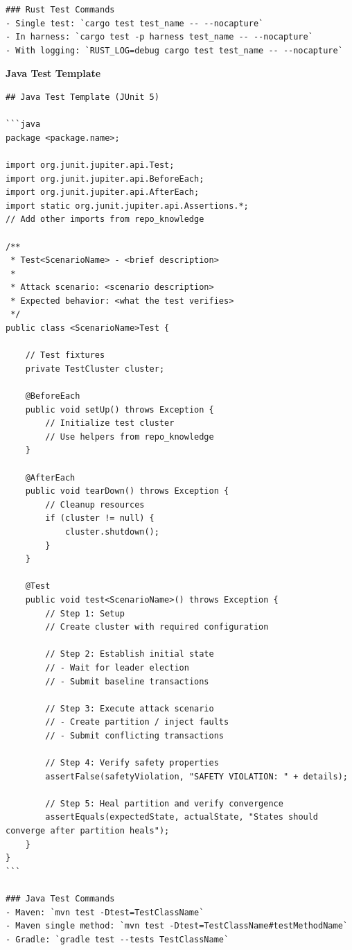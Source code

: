 \documentclass{article}
\theoremstyle{plain}
\theoremstyle{definition}
\theoremstyle{remark}
\begin{document}
\begin{agentbox}
{\begin{Verbatim}[fontsize=\scriptsize]
### Rust Test Commands
- Single test: `cargo test test_name -- --nocapture`
- In harness: `cargo test -p harness test_name -- --nocapture`
- With logging: `RUST_LOG=debug cargo test test_name -- --nocapture`
    \end{Verbatim}
    
    \textbf{Java Test Template}
    
    \begin{Verbatim}[fontsize=\scriptsize]
## Java Test Template (JUnit 5)

```java
package <package.name>;

import org.junit.jupiter.api.Test;
import org.junit.jupiter.api.BeforeEach;
import org.junit.jupiter.api.AfterEach;
import static org.junit.jupiter.api.Assertions.*;
// Add other imports from repo_knowledge

/**
 * Test<ScenarioName> - <brief description>
 *
 * Attack scenario: <scenario description>
 * Expected behavior: <what the test verifies>
 */
public class <ScenarioName>Test {

    // Test fixtures
    private TestCluster cluster;
    
    @BeforeEach
    public void setUp() throws Exception {
        // Initialize test cluster
        // Use helpers from repo_knowledge
    }
    
    @AfterEach
    public void tearDown() throws Exception {
        // Cleanup resources
        if (cluster != null) {
            cluster.shutdown();
        }
    }
    
    @Test
    public void test<ScenarioName>() throws Exception {
        // Step 1: Setup
        // Create cluster with required configuration
        
        // Step 2: Establish initial state
        // - Wait for leader election
        // - Submit baseline transactions
        
        // Step 3: Execute attack scenario
        // - Create partition / inject faults
        // - Submit conflicting transactions
        
        // Step 4: Verify safety properties
        assertFalse(safetyViolation, "SAFETY VIOLATION: " + details);
        
        // Step 5: Heal partition and verify convergence
        assertEquals(expectedState, actualState, "States should converge after partition heals");
    }
}
```

### Java Test Commands
- Maven: `mvn test -Dtest=TestClassName`
- Maven single method: `mvn test -Dtest=TestClassName#testMethodName`
- Gradle: `gradle test --tests TestClassName`
\end{Verbatim}
}
\end{agentbox}
\end{document}
